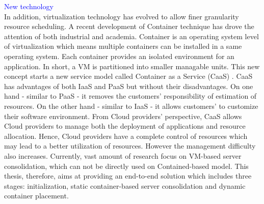 \textcolor{Blue}{New technology}\\
In addition, virtualization technology has evolved to allow finer granularity resource scheduling.
A recent development of Container technique \cite{Soltesz:2007cu} has drove the attention of both industrial and academia.
Container is an operating system level of virtualization which means multiple containers can be installed in a same operating system. Each container provides an isolated environment for an application. In short, a VM is partitioned into smaller managable units.
This new concept starts a new service model called Container as a Service (CaaS) \cite{Piraghaj:2015uf}. 
CaaS has advantages of both IaaS and PaaS but without their disadvantages. On one hand - similar to PaaS - it removes the customers' responsibility of estimation of resources. On the other hand - similar to IaaS - it allows customers' to customize their software environment. 
From Cloud providers' perspective, CaaS allows Cloud providers to manage both the deployment of applications and resource allocation.
Hence, Cloud providers have a complete control of resources which may lead to a better utilization of resources. However the management difficulty also increases. 
Currently, vast amount of research focus on VM-based server consolidation, which can not be directly used on Contained-based model.
This thesis, therefore, aims at providing an end-to-end solution which includes three stages: initialization, static container-based server consolidation and dynamic container placement.





